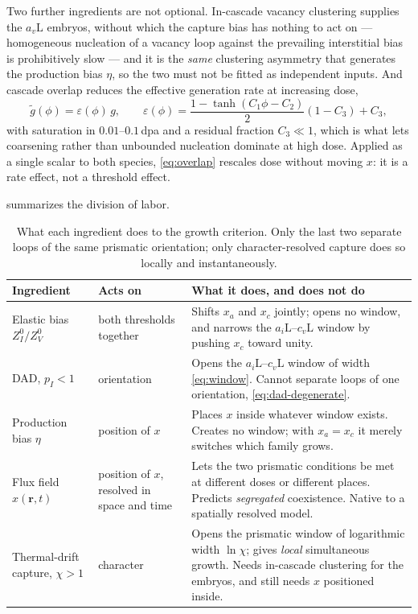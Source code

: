 \documentclass{article}
\newcommand{\aiL}{a_{i}\mathrm{L}}
\newcommand{\avL}{a_{v}\mathrm{L}}
\newcommand{\cvL}{c_{v}\mathrm{L}}
\begin{document}
Two further ingredients are not optional. In-cascade vacancy clustering supplies
the $\avL$ embryos, without which the capture bias has nothing to act on ---
homogeneous nucleation of a vacancy loop against the prevailing interstitial
bias is prohibitively slow --- and it is the \emph{same} clustering asymmetry
that generates the production bias $\eta$, so the two must not be fitted as
independent inputs. And cascade overlap reduces the effective generation rate at
increasing dose,
\begin{equation}
  \tilde g(\phi)=\varepsilon(\phi)\,g,
  \qquad
  \varepsilon(\phi)=\frac{1-\tanh(C_1\phi-C_2)}{2}(1-C_3)+C_3,
  \label{eq:overlap}
\end{equation}
with saturation in $0.01$--$0.1\,$dpa and a residual fraction $C_3\ll1$, which is
what lets coarsening rather than unbounded nucleation dominate at high dose.
Applied as a single scalar to both species, \cref{eq:overlap} rescales dose
without moving $x$: it is a rate effect, not a threshold effect.

 summarizes the division of labor.

\begin{table}[htbp]
\centering
\caption{What each ingredient does to the growth criterion. Only the last two
separate loops of the same prismatic orientation; only character-resolved
capture does so locally and instantaneously.}
\label{tab:mechanisms}
\small
\begin{tabularx}{\textwidth}{@{}p{3.3cm} p{3.2cm} X@{}}
\toprule
Ingredient & Acts on & What it does, and does not do\\
\midrule
Elastic bias $Z^0_I/Z^0_V$ & both thresholds together &
Shifts $x_a$ and $x_c$ jointly; opens no window, and narrows the
$\aiL$--$\cvL$ window by pushing $x_c$ toward unity.\\
\addlinespace
DAD, $p_I<1$ & orientation &
Opens the $\aiL$--$\cvL$ window of width \cref{eq:window}. Cannot separate
loops of one orientation, \cref{eq:dad-degenerate}.\\
\addlinespace
Production bias $\eta$ & position of $x$ &
Places $x$ inside whatever window exists. Creates no window; with $x_a=x_c$ it
merely switches which family grows.\\
\addlinespace
Flux field $x(\bm r,t)$ & position of $x$, resolved in space and time &
Lets the two prismatic conditions be met at different doses or different places.
Predicts \emph{segregated} coexistence. Native to a spatially resolved model.\\
\addlinespace
Thermal-drift capture, $\chi>1$ & character &
Opens the prismatic window of logarithmic width $\ln\chi$; gives \emph{local}
simultaneous growth. Needs in-cascade clustering for the embryos, and still
needs $x$ positioned inside.\\
\bottomrule
\end{tabularx}
\end{table}
\end{document}
